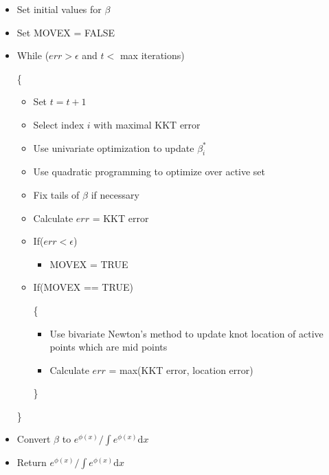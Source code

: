 	\vspace{3mm}
	
	\begin{itemize}
	
		\item Set initial values for $\beta$ 
		
		\item Set MOVEX = FALSE
		
		\item While ($err > \epsilon$ and $t <$ max iterations)
		
		\{
		
			\begin{itemize}
			
			\item Set $t = t + 1$
			
			\item Select index $i$ with maximal KKT error
			
			\item Use univariate optimization to update $\beta_i^*$
						
			\item Use quadratic programming to optimize over active set
			
			\item Fix tails of $\beta$ if necessary
			
			\item Calculate $err$ = KKT error
			
			\item If($err < \epsilon$)
				
				\begin{itemize}
				
				\item MOVEX = TRUE
				
				\end{itemize}
			
			\item If(MOVEX == TRUE)
				
				\{
				
				\begin{itemize}
										
				\item Use bivariate Newton's method to update knot location of active points which are mid points
				
				\item Calculate $err$ = max(KKT error, location error)
				
				\end{itemize}
			
				\}
			
			\end{itemize}
			
	\}
	
	\item Convert $\beta$ to $e^{\phi(x)} / \int e ^ {\phi(x)} \mathrm{d}x$
	
	\item Return $e^{\phi(x)} / \int e ^ {\phi(x)}\mathrm{d}x$
	
	\end{itemize}
	
